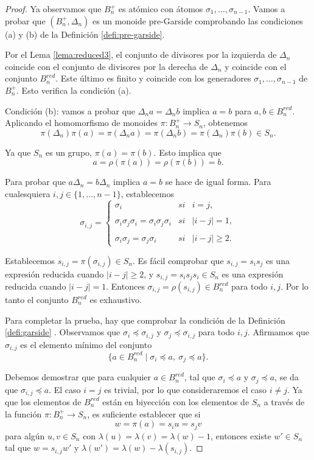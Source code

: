 \documentclass[12pt]{book}
\theoremstyle{definition}
\begin{document}
\begin{proof} Ya observamos que $B_n^+$ es atómico con átomos $\sigma_1,\ldots,\sigma_{n-1}$. Vamos a probar que $(B_n^+,\Delta_n)$ es un monoide pre-Garside comprobando las condiciones (a) y (b) de la Definición \ref{defi:pre-garside}.

Por el Lema \ref{lema:reduced3}, el conjunto de divisores por la izquierda de $\Delta_n$ coincide con el conjunto de divisores por la derecha de $\Delta_n$ y coincide con el conjunto $B_n^{red}$. Este último es finito y coincide con los generadores $\sigma_1,\ldots,\sigma_{n-1}$ de $B_n^+$. Esto verifica la condición (a).

Condición (b): vamos a probar que $\Delta_n a=\Delta_n b$ implica $ a=b$ para $a,b\in B_n^{red}.$ Aplicando el homomorfismo de monoides $\pi: B_n^+\rightarrow S_n$, obtenemos
$$\pi(\Delta_n)\pi(a)=\pi(\Delta_n a)=\pi(\Delta_n b)=\pi(\Delta_n)\pi(b)\in S_n.$$

Ya que $S_n$ es un grupo, $\pi(a)=\pi(b)$. Esto implica que
$$a=\rho(\pi(a))=\rho(\pi(b))=b.$$

Para probar que $a\Delta_n=b\Delta_n$ implica $ a=b$ se hace de igual forma.
Para cualesquiera $i,j\in\{1,\ldots,n-1\}$, establecemos
$$\sigma_{i,j}= \left\{ \begin{array}{lcc}
             \sigma_i &   si  & i=j, \\
             \\ \sigma_i\sigma_j\sigma_i=\sigma_i\sigma_j\sigma_i &  si & |i-j|=1, \\
             \\ \sigma_i\sigma_j=\sigma_j\sigma_i &  si  & |i-j|\geq 2.
             \end{array}
   \right.$$
   
Establecemos $s_{i,j}=\pi(\sigma_{i,j})\in S_n$. Es fácil comprobar que $s_{i,j}=s_is_j$ es una expresión reducida cuando $|i-j|\geq 2$, y $s_{i,j}=s_is_js_i\in S_n$ es una expresión reducida cuando $|i-j|=1$. Entonces $\sigma_{i,j}=\rho(s_{i,j})\in B_n^{red}$ para todo $i,j$. Por lo tanto el conjunto $B_n^{red}$ es exhaustivo.

Para completar la prueba, hay que comprobar la condición de la Definición \ref{defi:garside}
. Observamos que $\sigma_i\preceq \sigma_{i,j}$ y $\sigma_j\preceq\sigma_{i,j}$ para todo $i,j$. Afirmamos que $\sigma_{i,j}$ es el elemento mínimo del conjunto
$$\{a\in B_n^{red}\mid\sigma_i\preceq a,\ \sigma_j\preceq a\}.$$

Debemos demostrar que para cualquier $a\in B_n^{red}$, tal que $\sigma_i\preceq a$ y $\sigma_j\preceq a$, se da que $\sigma_{i,j}\preceq a$. El caso $i=j$ es trivial, por lo que consideraremos el caso $i\neq j$. Ya que los elementos de $B_n^{red}$ están en biyección con los elementos de $S_n$ a través de la función $\pi: B_n^+\rightarrow S_n$, es suficiente establecer que si
$$w=\pi(a)=s_iu=s_jv$$
para algún $u,v\in S_n$ con $\lambda(u)=\lambda(v)=\lambda(w)-1$, entonces existe $w'\in S_n$ tal que $w=s_{i,j}w'$ y $\lambda(w')=\lambda(w)-\lambda(s_{i,j})$.


\end{proof}
\end{document}
